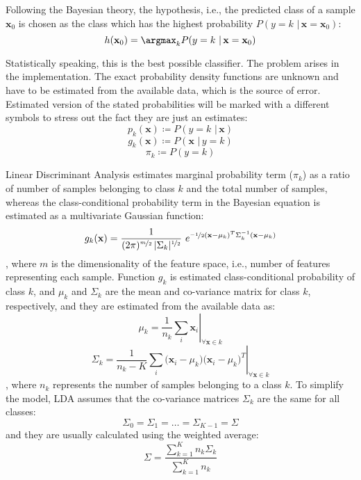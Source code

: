 \begin{appendix}
Following the Bayesian theory, the hypothesis, i.e., the predicted class of a sample $\mathbf{x}_0$ is chosen as the class which has the highest probability $P(y=k \,\, | \, \mathbf{x}=\mathbf{x}_0)$:
\begin{equation} 
h(\mathbf{x}_0) = \argmax_k P(y=k \,\, | \, \mathbf{x}=\mathbf{x}_0)
\end{equation}

Statistically speaking, this is the best possible classifier. The problem arises in the implementation. The exact probability density functions are unknown and have to be estimated from the available data, which is the source of error.
Estimated version of the stated probabilities will be marked with a different symbols to stress out the fact they are just an estimates:
\begin{equation} 
p_k(\mathbf{x}) \coloneqq P(y=k \,\, | \, \mathbf{x})
\end{equation}
\begin{equation} 
g_k(\mathbf{x}) \coloneqq P(\mathbf{x}  \,\, | \, y=k)
\end{equation}
\begin{equation} 
\pi_k \coloneqq P(y=k)
\end{equation}


Linear Discriminant Analysis estimates marginal probability term ($\pi_k$) as a ratio of number of samples belonging to class $k$ and the total  number of samples, whereas the class-conditional probability term in the Bayesian equation is estimated as a multivariate Gaussian function:
\begin{equation} 
g_k(\mathbf{x}) = \frac{1}{(2 \pi)^{\nicefrac{m}{2}}\, |\Sigma_k|^{\nicefrac{1}{2}}}\,\, e^{\nicefrac{-1}{2}  (\mathbf{x}-\mu_k)^T  \Sigma_k^{-1} (\mathbf{x}-\mu_k)} 
\end{equation}
\noindent
, where $m$ is the dimensionality of the feature space, i.e., number of features representing each sample. Function $g_k$ is estimated class-conditional probability of class $k$, and $\mu_k$ and $\Sigma_k$ are the mean and co-variance matrix for class $k$, respectively, and they are estimated from the available data as:
\begin{equation}
\left. \mu_k = \frac{1}{n_k} \sum_{i}{\mathbf{x}_i} \right\vert_{\forall \mathbf{x} \in k}
\end{equation}
\begin{equation}
\left. \Sigma_k = \frac{1}{n_k-K} \sum_{i}{\Big( \mathbf{x}_i - \mu_k \Big) \Big( \mathbf{x}_i - \mu_k \Big)^T} \right\vert_{\forall \mathbf{x} \in k}
\end{equation}
\noindent
, where $n_k$ represents the number of samples belonging to a class $k$.
To simplify the model, LDA assumes that the co-variance matrices $\Sigma_k$ are the same for all classes:
\begin{equation} 
\Sigma_0 = \Sigma_1 = \dots = \Sigma_{K-1} = \Sigma
\end{equation}
\noindent
and they are usually calculated using the weighted average:
\begin{equation} 
\Sigma = \frac{\sum_{k=1}^K {n_k\Sigma_k}}{\sum_{k=1}^K{n_k}}
\end{equation}


\end{appendix}
